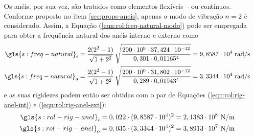\documentclass[12pt,oneside,english,brazil,lmodern,siglas,simbolos,cite=num]{ucsmonograph}
\begin{document}
	Os anéis, por sua vez, são tratados como elementos flexíveis -- ou contínuos.
	Conforme proposto no item \ref{sec:props-aneis}, apenas o modo de vibração $n=2$ é considerado.
	Assim, a Equação (\ref{eqn:rol:freq-natural-modo}) pode ser empregada para obter a frequência natural dos anéis interno e externo como
	\begin{align*}
		\gls{s:freq-natural}_i &= \frac{2(2^2 - 1)}{\sqrt{1+2^2}}\,
		\sqrt{\frac{200\cdot 10^9\cdot 37,424\cdot 10^{-12}}{0,301
		\cdot 0,01165^4}} = 9,8587\cdot 10^4\ \text{rad/s} \\
		\gls{s:freq-natural}_o &= \frac{2(2^2 - 1)}{\sqrt{1+2^2}}\,
		\sqrt{\frac{200\cdot 10^9\cdot 31,802\cdot 10^{-12}}{0,289
		\cdot 0,01943^4}} = 3,3344\cdot 10^4\ \text{rad/s} 
	\end{align*}
	e as suas rigidezes podem então ser obtidas com o par de Equações (\ref{eqn:rol:rig-anel-int}) e (\ref{eqn:rol:rig-anel-ext}):
	\begin{align*}
		\gls{s:rol-rig-anel}_i &= 0,022\cdot(9,8587\cdot 10^4)^2 =
		2,1383\cdot10^8\ \text{N/m} \\
		\gls{s:rol-rig-anel}_o &= 0,035\cdot(3,3344\cdot 10^4)^2 =
		3,8913\cdot10^7\ \text{N/m}
	\end{align*}
	
	\postextual
	
	
		
\end{document}
